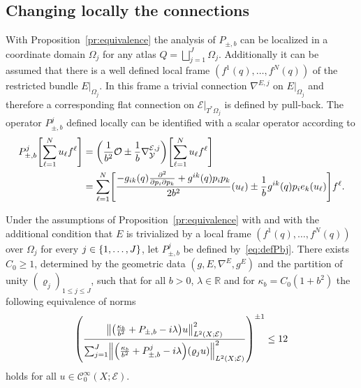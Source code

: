 \documentclass[10pt]{amsart}
\theoremstyle{definition}\newtheorem{defi}[theo]{Definition}\newtheorem{rema}[theo]{Remark}\newtheorem{exam}[theo]{Example}\newtheorem{exem}[theo]{Example}\newtheorem{nota}[theo]{Notation}
\newcommand{\R}{\mathbb{R}}
\newcommand{\clC}{\mathcal{C}}
\newcommand{\clY}{\mathcal{Y}}
\newcommand{\clO}{\mathcal{O}}
\newcommand{\clE}{\mathcal{E}}
\newcommand\norm[1]{\left\lVert#1\right\rVert}
\let\originalleft\left
\let\originalright\right
\renewcommand{\left}{\mathopen{}\mathclose\bgroup\originalleft}
\renewcommand{\right}{\aftergroup\egroup\originalright}
\begin{document}
\subsection{Changing locally the connections}\label{sec:locchangeconnec}

With Proposition~\ref{pr:equivalence} the analysis of $P_{\pm,b}$ can be localized in a coordinate domain $\Omega_{j}$ for any atlas $Q=\bigsqcup_{j=1}^{J}\Omega_{j}$. Additionally it can be assumed that there is a well defined local frame $(f^{1}(q),\dots,f^{N}(q))$ of the restricted bundle $E|_{\Omega_{j}}$. In this frame a trivial connection $\nabla^{E,j}$ on $E|_{\Omega_{j}}$ and therefore a corresponding flat connection on $\clE|_{T^{*}\Omega_{j}}$ is defined by pull-back. The operator $P_{\pm, b}^{j}$ defined locally can be identified with a scalar operator according to
\begin{equation}\label{eq:defPbj}
\begin{aligned}[t]
P_{\pm,b}^{j}\left[\sum_{\ell=1}^{N}u_{\ell}f^{\ell}\right]&=
\left(\frac{1}{b^{2}}\clO\pm \frac{1}{b}\nabla^{\clE,j}_{\clY}\right)\left[\sum_{\ell=1}^{N}u_{\ell}f^{\ell}\right]
\\
&=\sum_{\ell=1}^{N}
\left[\frac{-g_{ik}(q)\frac{\partial^{2}}{\partial p_{i}\partial p_{k}}+ g^{ik}(q)p_{i}p_{k}}{2b^{2}}(u_{\ell})
\pm \frac{1}{b}g^{ik}(q)p_{i}e_{k}(u_{\ell})\right]f^{\ell} .
\end{aligned}
\end{equation}
\begin{prop}\label{pr:locscalPb}
Under the assumptions of Proposition~\ref{pr:equivalence} with and with the additional condition that $E$ is trivialized by a local frame $(f^{1}(q),\dots, f^{N}(q))$ over $\Omega_{j}$ for every $j\in \left\{1,\dots,J\right\}$, let $P_{\pm, b}^{j}$ be defined by~\eqref{eq:defPbj}. There exists $C_{0}\geq 1$, determined by the geometric data $(g,E,\nabla^{E},g^{E})$ and the partition of unity $(\varrho_{j})_{1\leq j\leq J}$, such that for all $b>0$, $\lambda\in \R$ and for $\kappa_{b}=C_{0}(1+b^{2})$ the following equivalence of norms
\begin{equation}\label{eq:locscalPb}
\left(
\frac{\norm{\left(\frac{\kappa_{b}}{b^{2}}+P_{\pm, b}-i\lambda\right)u}^{2}_{L^{2}(X;\clE)}} {\sum_{j=1}^{J}\norm{\left(\frac{\kappa_{b}}{b^{2}}+P^{j}_{\pm,b}-i\lambda\right)(\varrho_{j}u)}^{2}_{L^{2}(X;\clE)}}
\right)^{\pm 1}\leq 12
\end{equation}
holds for all $ u\in \clC^{\infty}_{0}(X;\clE)$.
\end{prop}
\end{document}
